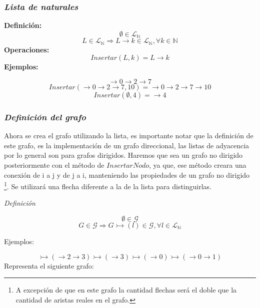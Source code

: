\documentclass{article}
\begin{document}
\subsubsection*{\emph{Lista de naturales}}
\textbf{Definición:}
\[ \emptyset \in \mathcal{L}_{\mathbb{N}} \]
\[ L \in \mathcal{L}_\mathbb{N} \Rightarrow L \rightarrow k \in \mathcal{L}_\mathbb{N}, \forall k \in \mathbb{N}\]
\textbf{Operaciones:}
\[ Insertar(L, k) = L \rightarrow k\]
\newline
\textbf{Ejemplos:}

\[ \rightarrow 0 \rightarrow 2 \rightarrow 7 \]
\[ Insertar(\rightarrow 0 \rightarrow 2 \rightarrow 7, 10) =  \rightarrow 0 \rightarrow 2 \rightarrow 7 \rightarrow 10\]
\[ Insertar(\emptyset, 4) = \rightarrow 4 \]

\subsubsection*{\emph{Definición del grafo}}
Ahora se crea el grafo utilizando la lista, es importante notar que la definición 
de este grafo, es la implementación de un grafo direccional, las listas 
de adyacencia por lo general son para grafos dirigidos. Haremos que sea un grafo
no dirigido posteriormente con el método de $InsertarNodo$, ya que, ese método creara 
una conexión de i a j y de j a i, manteniendo las propiedades de un grafo no dirigido
\footnote{A excepción de que en este grafo la cantidad flechas será el doble que la 
cantidad de aristas reales en el grafo.}. Se utilizará una flecha diferente a la 
de la lista para distinguirlas.

\emph{Definición}

\[ \emptyset \in \mathcal{G} \]
\[ G \in \mathcal{G} \Rightarrow G \rightarrowtail (l) \in \mathcal{G} , \forall l \in \mathcal{L}_\mathbb{N} \]

Ejemplos:

\[ \rightarrowtail ( \rightarrow 2 \rightarrow 3) \rightarrowtail (\rightarrow 3) \rightarrowtail (\rightarrow 0) \rightarrowtail (\rightarrow 0 \rightarrow 1) \]
Representa el siguiente grafo: 

\begin{center}
\end{center}
\end{document}

